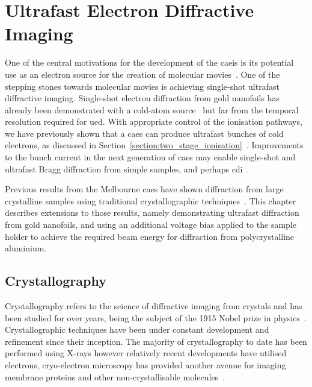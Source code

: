 \chapter{Ultrafast Electron Diffractive Imaging}\label{chapter:diffraction}

One of the central motivations for the development of the \gls{caeis} is its potential use as an electron source for the creation of molecular movies~\cite{van_der_geer_ultracold_2009}.
One of the stepping stones towards molecular movies is achieving single-shot ultrafast diffractive imaging.
Single-shot electron diffraction from gold nanofoils has already been demonstrated with a cold-atom source~\cite{speirs_single-shot_2015} but far from the temporal resolution required for \gls{ued}.
With appropriate control of the ionisation pathways, we have previously shown that a \gls{caes} can produce ultrafast bunches of cold electrons, as discussed in Section~\ref{section:two_stage_ionisation}~\cite{speirs_single-shot_2015,speirs_identification_2017,speirs_electron_2017}.
Improvements to the bunch current in the next generation of \gls{caes} may enable single-shot and ultrafast Bragg diffraction from simple samples, and perhaps \gls{cdi}~\cite{mcculloch_cold_2016}.

Previous results from the Melbourne \gls{caes} have shown diffraction from large crystalline samples using traditional crystallographic techniques~\cite{speirs_single-shot_2015,speirs_electron_2017}.
This chapter describes extensions to those results, namely demonstrating ultrafast diffraction from gold nanofoils, and using an additional voltage bias applied to the sample holder to achieve the required beam energy for diffraction from polycrystalline aluminium.

\section{Crystallography}

Crystallography refers to the science of diffractive imaging from crystals and has been studied for over \unit[100]{years}, being the subject of the 1915 Nobel prize in physics~\cite{bragg_structure_1913}.
Crystallographic techniques have been under constant development and refinement since their inception.
The majority of crystallography to date has been performed using X-rays however relatively recent developments have utilised electrons, cryo-electron microscopy has provided another avenue for imaging membrane proteins and other non-crystallisable molecules~\cite{zeitler_cryo_1982,cowley_electron_1992}.

